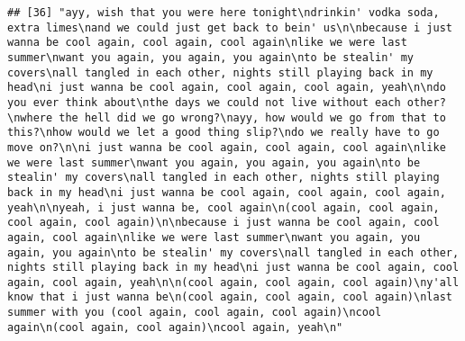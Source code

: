 \documentclass[]{article}
\begin{document}
\begin{verbatim}
## [36] "ayy, wish that you were here tonight\ndrinkin' vodka soda, extra limes\nand we could just get back to bein' us\n\nbecause i just wanna be cool again, cool again, cool again\nlike we were last summer\nwant you again, you again, you again\nto be stealin' my covers\nall tangled in each other, nights still playing back in my head\ni just wanna be cool again, cool again, cool again, yeah\n\ndo you ever think about\nthe days we could not live without each other?\nwhere the hell did we go wrong?\nayy, how would we go from that to this?\nhow would we let a good thing slip?\ndo we really have to go move on?\n\ni just wanna be cool again, cool again, cool again\nlike we were last summer\nwant you again, you again, you again\nto be stealin' my covers\nall tangled in each other, nights still playing back in my head\ni just wanna be cool again, cool again, cool again, yeah\n\nyeah, i just wanna be, cool again\n(cool again, cool again, cool again, cool again)\n\nbecause i just wanna be cool again, cool again, cool again\nlike we were last summer\nwant you again, you again, you again\nto be stealin' my covers\nall tangled in each other, nights still playing back in my head\ni just wanna be cool again, cool again, cool again, yeah\n\n(cool again, cool again, cool again)\ny'all know that i just wanna be\n(cool again, cool again, cool again)\nlast summer with you (cool again, cool again, cool again)\ncool again\n(cool again, cool again)\ncool again, yeah\n"                                                                                                                                                                                                                                                                                                                                                                                                                                                                                                                                                                                                                                                                                                                                                                                                                                                                                                                                                                                                                                                                                                                                                                                                                                                                                                                                                                                                                                                           

\end{verbatim}
\end{document}
